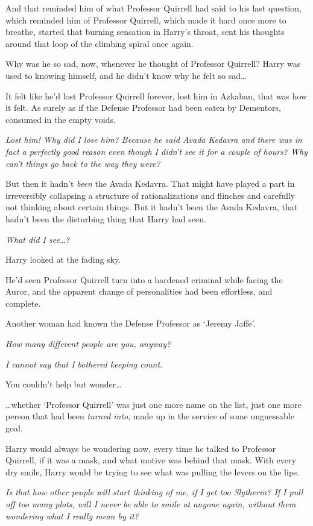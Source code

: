 And that reminded him of what Professor Quirrell had said to his last question, which reminded him of Professor Quirrell, which made it hard once more to breathe, started that burning sensation in Harry's throat, sent his thoughts around that loop of the climbing spiral once again.

Why was he so sad, now, whenever he thought of Professor Quirrell? Harry was used to knowing himself, and he didn't know why he felt so sad{\ldots}

It felt like he'd lost Professor Quirrell forever, lost him in Azkaban, that was how it felt. As surely as if the Defense Professor had been eaten by Dementors, consumed in the empty voids.

\emph{Lost him! Why did I lose him? Because he said Avada Kedavra and there was in fact a perfectly good reason even though I didn't see it for a couple of hours? Why can't things go back to the way they were?}

But then it hadn't \emph{been} the Avada Kedavra. That might have played a part in irreversibly collapsing a structure of rationalizations and flinches and carefully not thinking about certain things. But it hadn't been the Avada Kedavra, that hadn't been the disturbing thing that Harry had seen.

\emph{What did I see{\ldots}?}

Harry looked at the fading sky.

He'd seen Professor Quirrell turn into a hardened criminal while facing the Auror, and the apparent change of personalities had been effortless, and complete.

Another woman had known the Defense Professor as `Jeremy Jaffe'.

\emph{How many different people are you, anyway?}

\emph{I cannot say that I bothered keeping count.}

You couldn't help but wonder{\ldots}

{\ldots}whether `Professor Quirrell' was just one more name on the list, just one more person that had been \emph{turned into}, made up in the service of some unguessable goal.

Harry would always be wondering now, every time he talked to Professor Quirrell, if it was a mask, and what motive was behind that mask. With every dry smile, Harry would be trying to see what was pulling the levers on the lips.

\emph{Is that how other people will start thinking of me, if I get too Slytherin? If I pull off too many plots, will I never be able to smile at anyone again, without them wondering what I really mean by it?}

